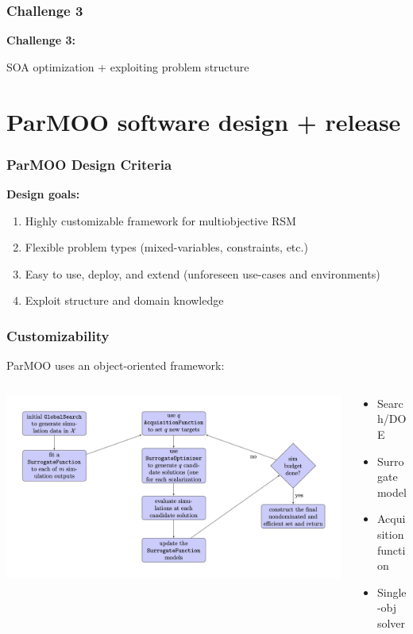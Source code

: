 \documentclass[aspectratio=169]{beamer}
\begin{document}
\begin{frame}\frametitle{Challenge 3}
\vfill
\begin{center}
{\Huge \bf
Challenge 3:\\

\bigskip

SOA optimization + exploiting problem structure
}
\end{center}
\vfill
\end{frame}

\section{ParMOO software design + release}

\begin{frame}\frametitle{ParMOO Design Criteria}

{\large
\textbf{Design goals:}}

\medskip

\begin{enumerate}
\item Highly customizable framework for multiobjective RSM
\item Flexible problem types (mixed-variables, constraints, etc.)
\item Easy to use, deploy, and extend (unforeseen use-cases and environments)
\item Exploit structure and domain knowledge
\end{enumerate}
\end{frame}

\begin{frame}\frametitle{Customizability}
ParMOO uses an object-oriented framework:\\
\begin{columns}
\begin{column}{0.7\textwidth}
\includegraphics[width=\textwidth]{algorithm-flowchart.png}
\end{column}
\begin{column}{0.3\textwidth}
\pause
\begin{itemize}
\item Search/DOE
\item Surrogate model
\item Acquisition function
\item Single-obj solver
\end{itemize}
\end{column}
\end{columns}
\end{frame}
\end{document}

